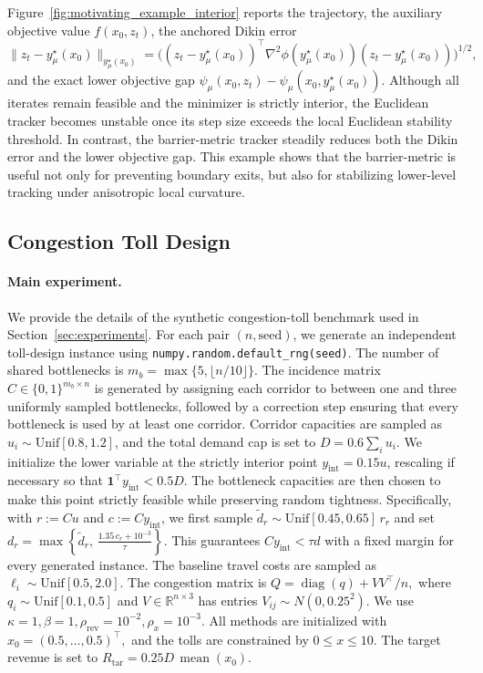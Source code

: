 \documentclass{article}
\begin{document}
Figure~\ref{fig:motivating_example_interior} reports the trajectory, the auxiliary objective value
\(f(x_0,z_t)\), the anchored Dikin error
\[
\|z_t-y_\mu^\star(x_0)\|_{y_\mu^\star(x_0)}
=
\Big(
(z_t-y_\mu^\star(x_0))^\top
\nabla^2\phi(y_\mu^\star(x_0))
(z_t-y_\mu^\star(x_0))
\Big)^{1/2},
\]
and the exact lower objective gap \(
\psi_\mu(x_0,z_t)-\psi_\mu(x_0,y_\mu^\star(x_0)).
\) Although all iterates remain feasible and the minimizer is strictly interior, the Euclidean tracker
becomes unstable once its step size exceeds the local Euclidean stability threshold. In contrast, the
barrier-metric tracker steadily reduces both the Dikin error and the lower objective gap. This example
shows that the barrier-metric is useful not only for preventing boundary exits, but also for stabilizing
lower-level tracking under anisotropic local curvature.


\subsection{Congestion Toll Design}
\label{app:toll_design}

\paragraph{Main experiment.}
We provide the details of the synthetic congestion-toll benchmark used in Section~\ref{sec:experiments}.
For each pair \((n,\mathrm{seed})\), we generate an independent toll-design instance using
\texttt{numpy.random.default\_rng(seed)}. The number of shared bottlenecks is
\(
m_b=\max\{5,\lfloor n/10\rfloor\}.
\)
The incidence matrix \(C\in\{0,1\}^{m_b\times n}\) is generated by assigning each corridor to
between one and three uniformly sampled bottlenecks, followed by a correction step ensuring that
every bottleneck is used by at least one corridor. Corridor capacities are sampled as \(u_i\sim\mathrm{Unif}[0.8,1.2]\), and the total demand cap is set
to
\(
D=0.6\sum_i u_i .
\)
We initialize the lower variable at the strictly interior point \(y_{\mathrm{int}}=0.15u\), rescaling if
necessary so that \(\mathbf 1^\top y_{\mathrm{int}}<0.5D\). The bottleneck capacities are then chosen
to make this point strictly feasible while preserving random tightness. Specifically, with
\(r:=Cu\) and \(c:=Cy_{\mathrm{int}}\), we first sample
\(\widetilde d_r\sim\mathrm{Unif}[0.45,0.65]\,r_r\) and set
\(
d_r
=
\max\left\{
\widetilde d_r,\,
\frac{1.35\,c_r+10^{-3}}{\tau}
\right\}.
\)
This guarantees \(Cy_{\mathrm{int}}<\tau d\) with a fixed margin for every generated instance. The baseline travel costs are sampled as \(\ell_i\sim\mathrm{Unif}[0.5,2.0]\). The congestion matrix is
\(
Q=\operatorname{diag}(q)+VV^\top/n,
\)
where \(q_i\sim\mathrm{Unif}[0.1,0.5]\) and \(V\in\mathbb R^{n\times 3}\) has entries
\(V_{ij}\sim N(0,0.25^2)\). We use
\(
\kappa=1,
\beta=1,
\rho_{\mathrm{rev}}=10^{-2},
\rho_x=10^{-3}.
\)
All methods are initialized with
\(
x_0=(0.5,\ldots,0.5)^\top,
\)
and the tolls are constrained by \(0\le x\le 10\). The target revenue is set to
\(
R_{\mathrm{tar}}=0.25D\,\operatorname{mean}(x_0).
\)
\end{document}
